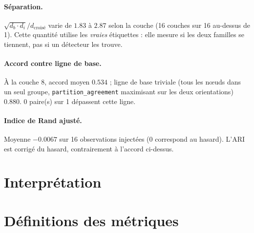 \documentclass[11pt,a4paper]{article}
\begin{document}
\paragraph{Séparation.} $\sqrt{d_b \cdot d_i} / d_{\text{croisé}}$ varie
de $1.83$ à $2.87$ selon la couche
(16 couches sur 16 au-dessus de 1).
Cette quantité utilise les \emph{vraies} étiquettes : elle mesure si les deux
familles se tiennent, pas si un détecteur les trouve.



\paragraph{Accord contre ligne de base.} À la couche 8, accord moyen
$0.534$ ; ligne de base triviale (tous les n\oe uds dans
un seul groupe, \texttt{partition\_agreement} maximisant sur les deux
orientations) $0.880$.
0 paire(s) sur 1 dépassent cette ligne.



\paragraph{Indice de Rand ajusté.} Moyenne $-0.0067$ sur
16 observations injectées (0 correspond au hasard). L'ARI est corrigé
du hasard, contrairement à l'accord ci-dessus.


\section{Interprétation}



\section{Définitions des métriques}
\end{document}
